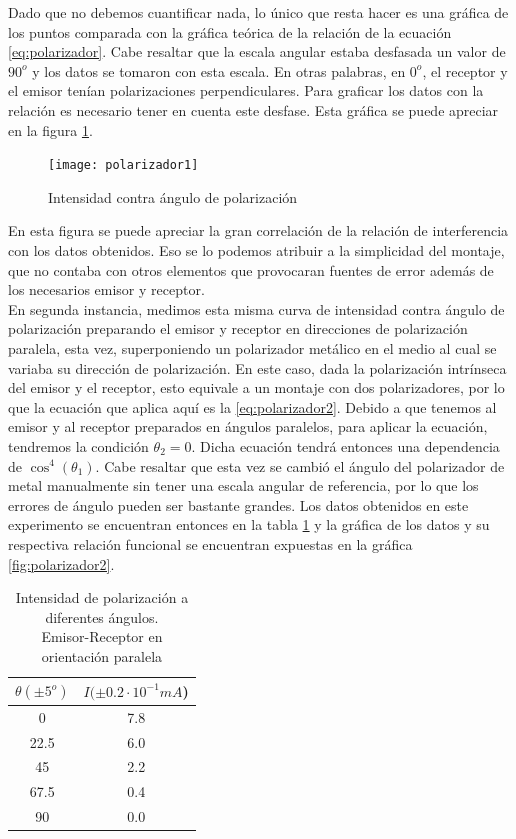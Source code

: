 \documentclass[%
 reprint,
 amsmath,amssymb,
 aps,
]{revtex4-1}
\begin{document}
Dado que no debemos cuantificar nada, lo único que resta hacer es una gráfica de los puntos comparada con la gráfica teórica de la relación de la ecuación \ref{eq:polarizador}. Cabe resaltar que la escala angular estaba desfasada un valor de $90^o$ y los datos se tomaron con esta escala. En otras palabras, en $0^o$, el receptor y el emisor tenían polarizaciones perpendiculares. Para graficar los datos con la relación es necesario tener en cuenta este desfase. Esta gráfica se puede apreciar en la figura \ref{fig:polarizador1}. \\


\begin{figure}[h!]
\centering
\texttt{[image: polarizador1]}
\caption{Intensidad contra ángulo de polarización}
\label{fig:polarizador1}
\end{figure}

En esta figura se puede apreciar la gran correlación de la relación de interferencia con los datos obtenidos. Eso se lo podemos atribuir a la simplicidad del montaje, que no contaba con otros elementos que provocaran fuentes de error además de los necesarios emisor y receptor.\\

En segunda instancia, medimos esta misma curva de intensidad contra ángulo de polarización preparando el emisor y receptor en direcciones de polarización paralela, esta vez, superponiendo un polarizador metálico en el medio al cual se variaba su dirección de polarización. En este caso, dada la polarización intrínseca del emisor y el receptor, esto equivale a un montaje con dos polarizadores, por lo que la ecuación que aplica aquí es la \ref{eq:polarizador2}. Debido a que tenemos al emisor y al receptor preparados en ángulos paralelos, para aplicar la ecuación, tendremos la condición $\theta_2 = 0$. Dicha ecuación tendrá entonces una dependencia de $\cos^4{(\theta_1)}$. Cabe resaltar que esta vez se cambió el ángulo del polarizador de metal manualmente sin tener una escala angular de referencia, por lo que los errores de ángulo pueden ser bastante grandes. Los datos obtenidos en este experimento se encuentran entonces en la tabla \ref{table:polarizador2} y la gráfica de los datos y su respectiva relación funcional se encuentran expuestas en la gráfica \ref{fig:polarizador2}. \\

\begin{table}[h!]
\centering
\begin{tabular}{|c|c|}
	\hline $ \theta (\pm 5^o) $ & $ I(\pm 0.2\cdot 10^{-1}mA  $)  \\ 
	\hline\hline
	0  &  7.8\\
	22.5 &  6.0\\ 
	45 &  2.2\\ 
	67.5 &  0.4\\ 
	90 &  0.0\\ 
	[1ex] 
 \hline
 \end{tabular} 
  \caption{Intensidad de polarización a diferentes ángulos.\\ Emisor-Receptor en orientación paralela}
\label{table:polarizador2} 
\end{table}
\end{document}
